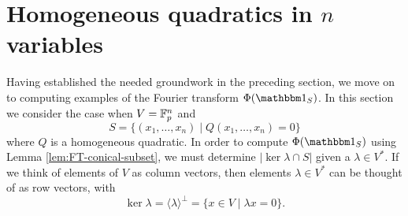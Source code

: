 \section{Homogeneous quadratics in $n$ variables}\label{sec:part1}
Having established the needed groundwork in the preceding section, we move on to computing examples of the Fourier transform $\Phi(\IND_S)$. In this section we consider the case when $V = \mathbb{F}_p^n$ and
\[
	S = \{(x_1,\ldots,x_n) \mid Q(x_1,\ldots,x_n) = 0\}
\]
where $Q$ is a homogeneous quadratic. In order to compute $\Phi(\IND_S)$ using Lemma \ref{lem:FT-conical-subset}, we must determine $|\ker \lambda \cap S|$ given a $\lambda \in V^*$. If we think of elements of $V$ as column vectors, then elements $\lambda \in V^*$ can be thought of as row vectors, with
\[
	\ker \lambda = \langle \lambda \rangle^\bot = \{x \in V \mid \lambda x =0\}.
\]

